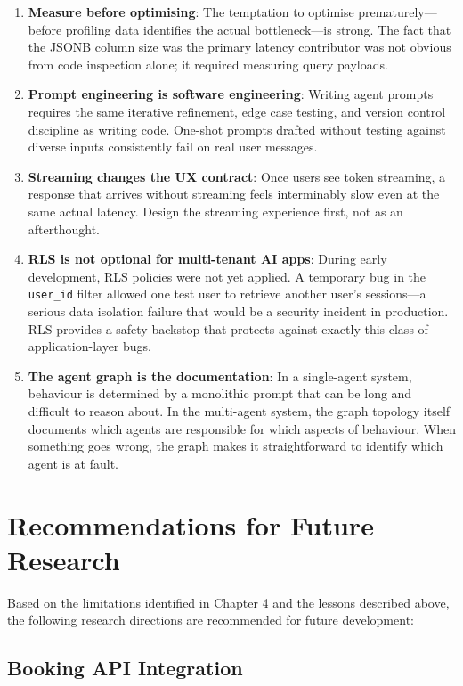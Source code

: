\documentclass[12pt,a4paper]{report}
\begin{document}
\begin{enumerate}[nosep]
  \item \textbf{Measure before optimising}: The temptation to optimise prematurely---before profiling data identifies the actual bottleneck---is strong. The fact that the JSONB column size was the primary latency contributor was not obvious from code inspection alone; it required measuring query payloads.
  \item \textbf{Prompt engineering is software engineering}: Writing agent prompts requires the same iterative refinement, edge case testing, and version control discipline as writing code. One-shot prompts drafted without testing against diverse inputs consistently fail on real user messages.
  \item \textbf{Streaming changes the UX contract}: Once users see token streaming, a response that arrives without streaming feels interminably slow even at the same actual latency. Design the streaming experience first, not as an afterthought.
  \item \textbf{RLS is not optional for multi-tenant AI apps}: During early development, RLS policies were not yet applied. A temporary bug in the \texttt{user\_id} filter allowed one test user to retrieve another user's sessions---a serious data isolation failure that would be a security incident in production. RLS provides a safety backstop that protects against exactly this class of application-layer bugs.
  \item \textbf{The agent graph is the documentation}: In a single-agent system, behaviour is determined by a monolithic prompt that can be long and difficult to reason about. In the multi-agent system, the graph topology itself documents which agents are responsible for which aspects of behaviour. When something goes wrong, the graph makes it straightforward to identify which agent is at fault.
\end{enumerate}

\section{Recommendations for Future Research}

Based on the limitations identified in Chapter 4 and the lessons described above, the following research directions are recommended for future development:

\subsection{Booking API Integration}
\end{document}
